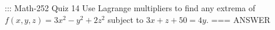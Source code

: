 ::: Math-252 Quiz 14
Use Lagrange multipliers to find any extrema of
\(f(x,y,z)=3x^2-y^2+2z^2\) subject to
\(3x+z+50=4y\).
===
ANSWER
